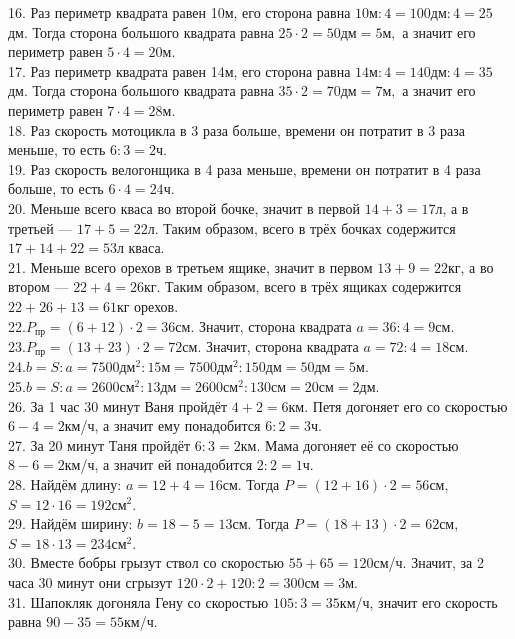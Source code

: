 \documentclass[12pt]{article}
\begin{document}
16. Раз периметр квадрата равен 10м, его сторона равна $10\text{м}:4=100\text{дм}:4=25$дм. Тогда сторона большого квадрата равна $25\cdot2=50\text{дм}=5\text{м},$ а значит его периметр равен $5\cdot4=20$м.\\
17. Раз периметр квадрата равен 14м, его сторона равна $14\text{м}:4=140\text{дм}:4=35$дм. Тогда сторона большого квадрата равна $35\cdot2=70\text{дм}=7\text{м},$ а значит его периметр равен $7\cdot4=28$м.\\
18. Раз скорость мотоцикла в 3 раза больше, времени он потратит в 3 раза меньше, то есть $6:3=2$ч.\\
19. Раз скорость велогонщика в 4 раза меньше, времени он потратит в 4 раза больше, то есть $6\cdot4=24$ч.\\
20. Меньше всего кваса во второй бочке, значит в первой $14+3=17$л, а в третьей --- $17+5=22$л. Таким образом, всего в трёх бочках содержится $17+14+22=53$л кваса.\\
21. Меньше всего орехов в третьем ящике, значит в первом $13+9=22$кг, а во втором --- $22+4=26$кг. Таким образом, всего в трёх ящиках содержится $22+26+13=61$кг орехов.\\
22.$P_{\text{пр}}=(6+12)\cdot2=36$см. Значит, сторона квадрата $a=36:4=9$см.\\
23.$P_{\text{пр}}=(13+23)\cdot2=72$см. Значит, сторона квадрата $a=72:4=18$см.\\
24.$b=S:a=7500\text{дм}^2:15\text{м}=7500\text{дм}^2:150\text{дм}=50\text{дм}=5$м.\\
25.$b=S:a=2600\text{см}^2:13\text{дм}=2600\text{см}^2:130\text{см}=20\text{см}=2$дм.\\
26. За 1 час 30 минут Ваня пройдёт $4+2=6$км. Петя догоняет его со скоростью $6-4=2$км/ч, а значит ему понадобится $6:2=3$ч.\\
27. За 20 минут Таня пройдёт $6:3=2$км. Мама догоняет её со скоростью $8-6=2$км/ч, а значит ей понадобится $2:2=1$ч.\\
28. Найдём длину: $a=12+4=16$см. Тогда $P=(12+16)\cdot2=56$см, $S=12\cdot16=192\text{см}^2.$\\
29. Найдём ширину: $b=18-5=13$см. Тогда $P=(18+13)\cdot2=62$см, $S=18\cdot13=234\text{см}^2.$\\
30. Вместе бобры грызут ствол со скоростью $55+65=120$см/ч. Значит, за 2 часа 30 минут они сгрызут $120\cdot2+120:2=300\text{см}=3$м.\\
31. Шапокляк догоняла Гену со скоростью $105:3=35$км/ч, значит его скорость равна $90-35=55$км/ч.\\
\end{document}

